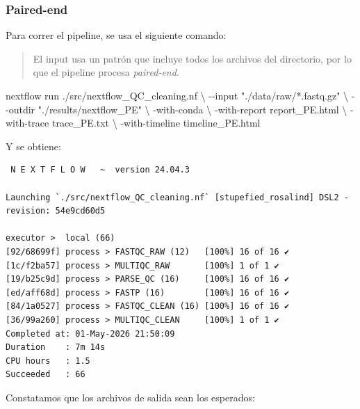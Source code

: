 \documentclass[
  letterpaper,
  DIV=11,
  numbers=noendperiod]{scrartcl}
\newenvironment{Shaded}{\begin{snugshade}}{\end{snugshade}}
\newcommand{\AttributeTok}[1]{\textcolor[rgb]{0.40,0.45,0.13}{#1}}
\newcommand{\DataTypeTok}[1]{\textcolor[rgb]{0.68,0.00,0.00}{#1}}
\newcommand{\ExtensionTok}[1]{\textcolor[rgb]{0.00,0.23,0.31}{#1}}
\newcommand{\NormalTok}[1]{\textcolor[rgb]{0.00,0.23,0.31}{#1}}
\newcommand{\StringTok}[1]{\textcolor[rgb]{0.13,0.47,0.30}{#1}}
\begin{document}
\subsubsection{Paired-end}\label{paired-end}

Para correr el pipeline, se usa el siguiente comando:

\begin{quote}
El input usa un patrón que incluye todos los archivos del directorio,
por lo que el pipeline procesa \emph{paired-end}.
\end{quote}

\begin{Shaded}
\begin{Highlighting}[]
\ExtensionTok{nextflow}\NormalTok{ run ./src/nextflow\_QC\_cleaning.nf }\DataTypeTok{\textbackslash{}}
  \AttributeTok{{-}{-}input} \StringTok{"./data/raw/*.fastq.gz"} \DataTypeTok{\textbackslash{}}
  \AttributeTok{{-}{-}outdir} \StringTok{"./results/nextflow\_PE"} \DataTypeTok{\textbackslash{}}
  \AttributeTok{{-}with{-}conda} \DataTypeTok{\textbackslash{}}
  \AttributeTok{{-}with{-}report}\NormalTok{ report\_PE.html }\DataTypeTok{\textbackslash{}}
  \AttributeTok{{-}with{-}trace}\NormalTok{ trace\_PE.txt }\DataTypeTok{\textbackslash{}}
  \AttributeTok{{-}with{-}timeline}\NormalTok{ timeline\_PE.html}
\end{Highlighting}
\end{Shaded}

Y se obtiene:

\begin{verbatim}
 N E X T F L O W   ~  version 24.04.3

Launching `./src/nextflow_QC_cleaning.nf` [stupefied_rosalind] DSL2 - revision: 54e9cd60d5

executor >  local (66)
[92/68699f] process > FASTQC_RAW (12)   [100%] 16 of 16 ✔
[1c/f2ba57] process > MULTIQC_RAW       [100%] 1 of 1 ✔
[19/b25c9d] process > PARSE_QC (16)     [100%] 16 of 16 ✔
[ed/aff68d] process > FASTP (16)        [100%] 16 of 16 ✔
[84/1a0527] process > FASTQC_CLEAN (16) [100%] 16 of 16 ✔
[36/99a260] process > MULTIQC_CLEAN     [100%] 1 of 1 ✔
Completed at: 01-May-2026 21:50:09
Duration    : 7m 14s
CPU hours   : 1.5
Succeeded   : 66
\end{verbatim}

Constatamos que los archivos de salida sean los esperados:
\end{document}
